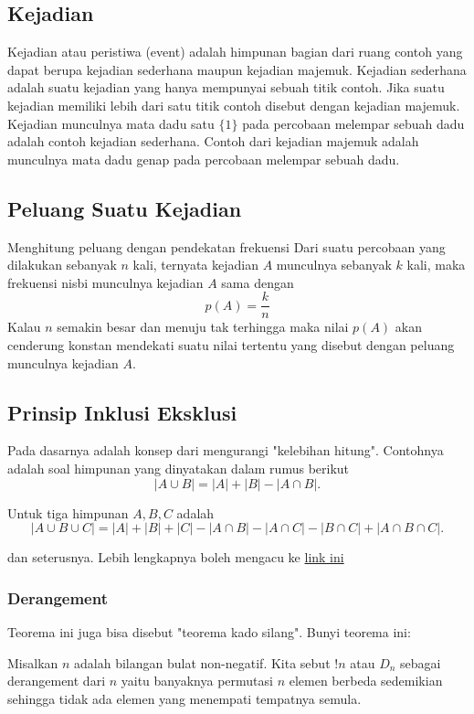 \documentclass[11pt]{scrartcl}
\begin{document}
\subsection{Kejadian}
Kejadian atau peristiwa (event) adalah himpunan bagian dari ruang contoh yang dapat berupa
kejadian sederhana maupun kejadian majemuk. Kejadian sederhana adalah suatu kejadian yang
hanya mempunyai sebuah titik contoh. Jika suatu kejadian memiliki lebih dari satu titik contoh 
disebut dengan kejadian majemuk. 
Kejadian munculnya mata dadu satu $\{1\}$ pada percobaan melempar sebuah dadu adalah contoh 
kejadian sederhana. Contoh dari kejadian majemuk adalah munculnya mata dadu genap pada 
percobaan melempar sebuah dadu. 
    
\subsection{Peluang Suatu Kejadian}
Menghitung peluang dengan pendekatan frekuensi 
Dari suatu percobaan yang dilakukan sebanyak $n$ kali, ternyata kejadian $A$ munculnya sebanyak 
$k$ kali, maka frekuensi nisbi munculnya kejadian $A$ sama dengan 
$$p(A)=\dfrac{k}{n}$$
Kalau $n$ semakin besar dan menuju tak terhingga maka nilai $p(A)$ akan cenderung konstan 
mendekati suatu nilai tertentu yang disebut dengan peluang munculnya kejadian $A$.

    \subsection{Prinsip Inklusi Eksklusi}
    Pada dasarnya adalah konsep dari mengurangi "kelebihan hitung". Contohnya adalah soal himpunan yang dinyatakan dalam rumus berikut
    $$|A \cup B|=|A|+|B|-|A \cap B|.$$
    
    Untuk tiga himpunan $A,B,C$ adalah
    $$|A \cup B \cup C|=|A|+|B|+|C|-|A \cap B|-|A \cap C|-|B \cap C|+|A \cap B \cap C|.$$
    
    dan seterusnya. Lebih lengkapnya boleh mengacu ke \href{https://brilliant.org/wiki/principle-of-inclusion-and-exclusion-pie/}{link ini}
    
    \subsubsection{Derangement}
    Teorema ini juga bisa disebut "teorema kado silang". Bunyi teorema ini:
    
    Misalkan $n$ adalah bilangan bulat non-negatif. Kita sebut $!n$ atau $D_n$ sebagai derangement dari $n$ yaitu banyaknya permutasi $n$ elemen berbeda sedemikian sehingga tidak ada elemen yang menempati tempatnya semula.
    
\end{document}
